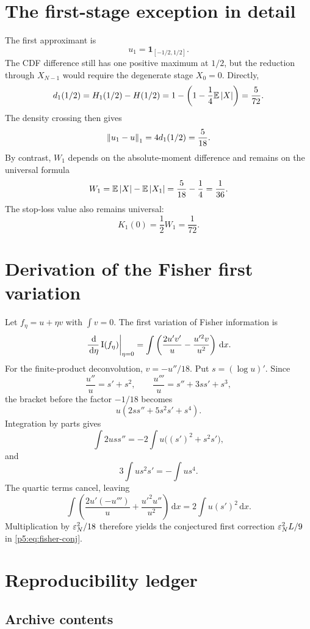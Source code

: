 \documentclass[11pt,oneside]{article}
\numberwithin{equation}{section}
\theoremstyle{definition}
\theoremstyle{remark}
\newcommand{\E}{\mathbb E}
\newcommand{\dd}{\,\mathrm d}
\begin{document}
\appendix

\section{The first-stage exception in detail}
\label{p5:app:first}

The first approximant is
\[
 u_1=\mathbf1_{[-1/2,1/2]}.
\]
The CDF difference still has one positive maximum at $1/2$, but the reduction through $X_{N-1}$ would require the degenerate stage $X_0=0$.  Directly,
\[
 d_1(1/2)=H_1(1/2)-H(1/2)
 =1-\left(1-\frac14\E\abs X\right)
 =\frac5{72}.
\]
The density crossing then gives
\[
 \left\lVert u_1-u\right\rVert_1=4d_1(1/2)=\frac5{18}.
\]
By contrast, $W_1$ depends on the absolute-moment difference and remains on the universal formula
\[
 W_1=\E\abs X-\E\abs{X_1}
 =\frac5{18}-\frac14=\frac1{36}.
\]
The stop-loss value also remains universal:
\[
 K_1(0)=\frac12W_1=\frac1{72}.
\]

\section{Derivation of the Fisher first variation}
\label{p5:app:fisher}

Let $f_\eta=u+\eta v$ with $\int v=0$.  The first variation of Fisher information is
\begin{equation}
 \left.\frac{\dd}{\dd\eta}\Fish(f_\eta)\right|_{\eta=0}
 =\int\left(\frac{2u'v'}u-\frac{u'^2v}{u^2}\right)\dd x.
 \label{p5:eq:fisher-variation}
\end{equation}
For the finite-product deconvolution, $v=-u''/18$.  Put $s=(\log u)'$.  Since
\[
 \frac{u''}{u}=s'+s^2,
 \qquad
 \frac{u'''}u=s''+3ss'+s^3,
\]
the bracket before the factor $-1/18$ becomes
\[
 u\left(2ss''+5s^2s'+s^4\right).
\]
Integration by parts gives
\[
 \int2uss''=-2\int u\bigl((s')^2+s^2s'\bigr),
\]
and
\[
 3\int us^2s'=-\int us^4.
\]
The quartic terms cancel, leaving
\[
 \int\left(\frac{2u'(-u''')}{u}+\frac{u'^2u''}{u^2}\right)\dd x
 =2\int u(s')^2\dd x.
\]
Multiplication by $\varepsilon_N^2/18$ therefore yields the conjectured first correction $\varepsilon_N^2L/9$ in \eqref{p5:eq:fisher-conj}.

\section{Reproducibility ledger}
\label{p5:app:repro}

\subsection{Archive contents}
\end{document}
